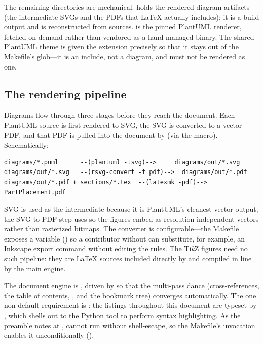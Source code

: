 The remaining directories are mechanical.  holds the rendered diagram
artifacts (the intermediate SVGs and the PDFs that \LaTeX{} actually includes); it is a
build output and is reconstructed from sources.  is the pinned
PlantUML renderer, fetched on demand rather than vendored as a hand-managed binary. The
shared PlantUML theme  is given the  extension
precisely so that it stays out of the Makefile's  glob---it is an
include, not a diagram, and must not be rendered as one.

\subsection{The rendering pipeline}

Diagrams flow through three stages before they reach the document. Each PlantUML source is
first rendered to SVG, the SVG is converted to a vector PDF, and that PDF is pulled into the
document by  (via the 
macro). Schematically:

\begin{verbatim}
diagrams/*.puml      --(plantuml -tsvg)-->     diagrams/out/*.svg
diagrams/out/*.svg   --(rsvg-convert -f pdf)-->  diagrams/out/*.pdf
diagrams/out/*.pdf + sections/*.tex  --(latexmk -pdf)-->  PartPlacement.pdf
\end{verbatim}

SVG is used as the intermediate because it is PlantUML's cleanest vector output; the
SVG-to-PDF step uses  so the figures embed as resolution-independent
vectors rather than rasterized bitmaps. The converter is configurable---the Makefile exposes
a  variable () so a contributor without 
can substitute, for example, an Inkscape export command without editing the rules. The
Ti\emph{k}Z figures need no such pipeline: they are \LaTeX{} sources included directly by
 and compiled in line by the main engine.

The document engine is , driven by  so that the multi-pass
dance (cross-references, the table of contents, , and the bookmark tree)
converges automatically. The one non-default requirement is : the
listings throughout this document are typeset by , which shells out to the
Python  tool to perform syntax highlighting. As the preamble notes at
,  cannot run without shell-escape, so the Makefile's
 invocation enables it unconditionally ().

